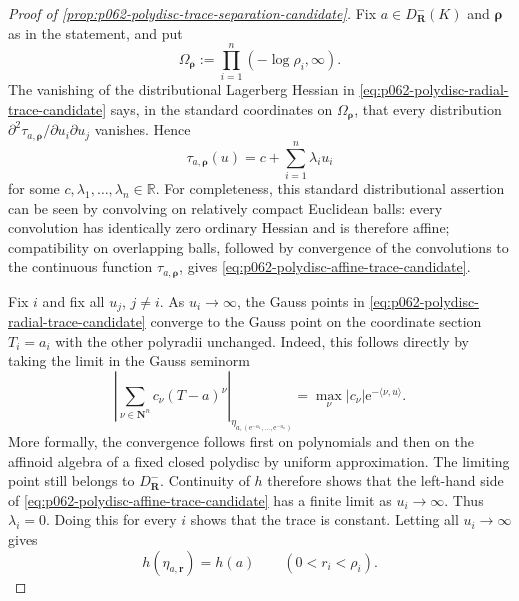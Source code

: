
\begin{proof}[Proof of \cref{prop:p062-polydisc-trace-separation-candidate}]
Fix \(a\in D^-_{\mathbf R}(K)\) and \(\boldsymbol\rho\) as in the
statement, and put
\[
 \Omega_{\boldsymbol\rho}
 :=\prod_{i=1}^n(-\log\rho_i,\infty).
\]
The vanishing of the distributional Lagerberg Hessian in
\eqref{eq:p062-polydisc-radial-trace-candidate} says, in the standard
coordinates on \(\Omega_{\boldsymbol\rho}\), that every distribution
\(\partial^2\tau_{a,\boldsymbol\rho}/\partial u_i\partial u_j\)
vanishes. Hence
\begin{equation}\label{eq:p062-polydisc-affine-trace-candidate}
 \tau_{a,\boldsymbol\rho}(u)=c+\sum_{i=1}^n\lambda_i u_i
\end{equation}
for some \(c,\lambda_1,\ldots,\lambda_n\in\mathbb R\). For completeness,
this standard distributional assertion can be seen by convolving on
relatively compact Euclidean balls: every convolution has identically
zero ordinary Hessian and is therefore affine; compatibility on
overlapping balls, followed by convergence of the convolutions to the
continuous function \(\tau_{a,\boldsymbol\rho}\), gives
\eqref{eq:p062-polydisc-affine-trace-candidate}.

Fix \(i\) and fix all \(u_j\), \(j\neq i\). As \(u_i\to\infty\), the
Gauss points in \eqref{eq:p062-polydisc-radial-trace-candidate} converge
to the Gauss point on the coordinate section \(T_i=a_i\) with the other
polyradii unchanged. Indeed, this follows directly by taking the limit
in the Gauss seminorm
\[
 \left|\sum_{\nu\in\mathbf N^n}c_\nu(T-a)^\nu\right|_{
                    \eta_{a,(\mathrm e^{-u_1},\ldots,\mathrm e^{-u_n})}}
 =\max_\nu |c_\nu|\mathrm e^{-\langle\nu,u\rangle}.
\]
More formally, the convergence follows first on polynomials and then on
the affinoid algebra of a fixed closed polydisc by uniform approximation.
The limiting point still belongs to \(D^-_{\mathbf R}\). Continuity of
\(h\) therefore shows that the left-hand side of
\eqref{eq:p062-polydisc-affine-trace-candidate} has a finite limit as
\(u_i\to\infty\). Thus \(\lambda_i=0\). Doing this for every \(i\)
shows that the trace is constant. Letting all \(u_i\to\infty\) gives
\begin{equation}\label{eq:p062-polydisc-radial-constant-candidate}
                   h(\eta_{a,\mathbf r})=h(a)
 \qquad (0<r_i<\rho_i).
\end{equation}


\end{proof}
